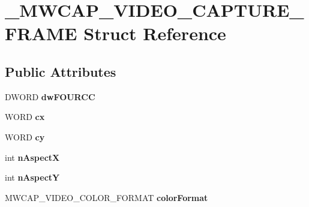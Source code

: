 \hypertarget{struct__MWCAP__VIDEO__CAPTURE__FRAME}{\section{\-\_\-\-M\-W\-C\-A\-P\-\_\-\-V\-I\-D\-E\-O\-\_\-\-C\-A\-P\-T\-U\-R\-E\-\_\-\-F\-R\-A\-M\-E Struct Reference}
\label{struct__MWCAP__VIDEO__CAPTURE__FRAME}
}
\subsection*{Public Attributes}
\begin{DoxyCompactItemize}
\item 
\hypertarget{struct__MWCAP__VIDEO__CAPTURE__FRAME_a789a948cd01dde795d047bfb03ffae25}{D\-W\-O\-R\-D {\bfseries dw\-F\-O\-U\-R\-C\-C}}\label{struct__MWCAP__VIDEO__CAPTURE__FRAME_a789a948cd01dde795d047bfb03ffae25}

\item 
\hypertarget{struct__MWCAP__VIDEO__CAPTURE__FRAME_ab392dbdbb4a0555cf6ae90cd20affe51}{W\-O\-R\-D {\bfseries cx}}\label{struct__MWCAP__VIDEO__CAPTURE__FRAME_ab392dbdbb4a0555cf6ae90cd20affe51}

\item 
\hypertarget{struct__MWCAP__VIDEO__CAPTURE__FRAME_a681eea6a100b56a0fa758c4132b95d2f}{W\-O\-R\-D {\bfseries cy}}\label{struct__MWCAP__VIDEO__CAPTURE__FRAME_a681eea6a100b56a0fa758c4132b95d2f}

\item 
\hypertarget{struct__MWCAP__VIDEO__CAPTURE__FRAME_a9bf62585053b423771856dad49718a19}{int {\bfseries n\-Aspect\-X}}\label{struct__MWCAP__VIDEO__CAPTURE__FRAME_a9bf62585053b423771856dad49718a19}

\item 
\hypertarget{struct__MWCAP__VIDEO__CAPTURE__FRAME_aa248811c5c5513342b9a43e723a06958}{int {\bfseries n\-Aspect\-Y}}\label{struct__MWCAP__VIDEO__CAPTURE__FRAME_aa248811c5c5513342b9a43e723a06958}

\item 
\hypertarget{struct__MWCAP__VIDEO__CAPTURE__FRAME_af163c141529d5a036a93b9d23dedb135}{M\-W\-C\-A\-P\-\_\-\-V\-I\-D\-E\-O\-\_\-\-C\-O\-L\-O\-R\-\_\-\-F\-O\-R\-M\-A\-T {\bfseries color\-Format}}\label{struct__MWCAP__VIDEO__CAPTURE__FRAME_af163c141529d5a036a93b9d23dedb135}


\end{DoxyCompactItemize}
